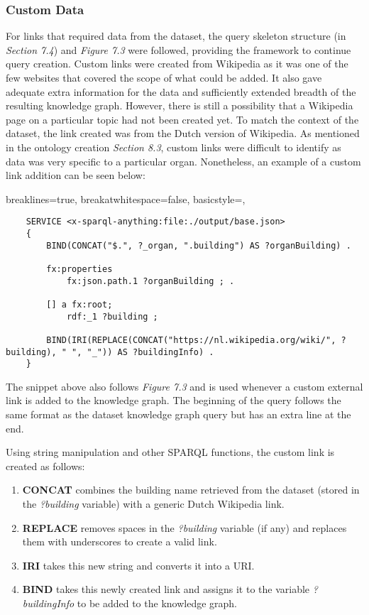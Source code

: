 \subsubsection{Custom Data}
\hspace*{0.5cm} For links that required data from the dataset, the query skeleton structure (in \textit{Section 7.4}) and \textit{Figure 7.3} were followed, providing the framework to continue query creation. Custom links were created from Wikipedia as it was one of the few websites that covered the scope of what could be added. It also gave adequate extra information for the data and sufficiently extended breadth of the resulting knowledge graph. However, there is still a possibility that a Wikipedia page on a particular topic had not been created yet. To match the context of the dataset, the link created was from the Dutch version of Wikipedia. As mentioned in the ontology creation \textit{Section 8.3}, custom links were difficult to identify as data was very specific to a particular organ. Nonetheless, an example of a custom link addition can be seen below:

\lstset
{
    breaklines=true,
    breakatwhitespace=false,
    basicstyle=\linespread{1.25}\ttfamily,
}
\begin{lstlisting}
    SERVICE <x-sparql-anything:file:./output/base.json>
    {
        BIND(CONCAT("$.", ?_organ, ".building") AS ?organBuilding) .
    
        fx:properties
            fx:json.path.1 ?organBuilding ; .
    
        [] a fx:root; 
            rdf:_1 ?building ;
    
        BIND(IRI(REPLACE(CONCAT("https://nl.wikipedia.org/wiki/", ?building), " ", "_")) AS ?buildingInfo) . 
    } 
\end{lstlisting}

The snippet above also follows \textit{Figure 7.3} and is used whenever a custom external link is added to the knowledge graph. The beginning of the query follows the same format as the dataset knowledge graph query but has an extra line at the end.

Using string manipulation and other SPARQL functions, the custom link is created as follows:
\begin{enumerate}
    \item \textbf{CONCAT} combines the building name retrieved from the dataset (stored in the \textit{?building} variable) with a generic Dutch Wikipedia link.
    \item \textbf{REPLACE} removes spaces in the \textit{?building} variable (if any) and replaces them with underscores to create a valid link. 
    \item \textbf{IRI} takes this new string and converts it into a URI.
    \item \textbf{BIND} takes this newly created link and assigns it to the variable \textit{?buildingInfo} to be added to the knowledge graph. 
\end{enumerate}

